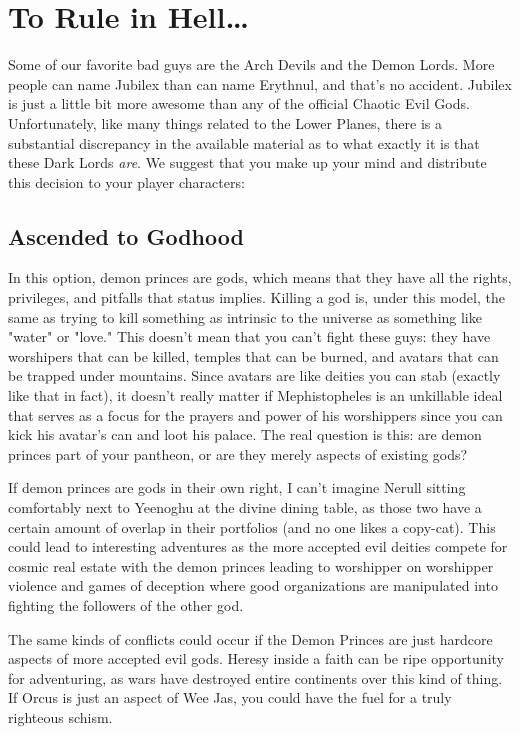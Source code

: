 \section{To Rule in Hell\ldots}

Some of our favorite bad guys are the Arch Devils and the Demon Lords. More people can name Jubilex than can name Erythnul, and that's no accident. Jubilex is just a little bit more awesome than any of the official Chaotic Evil Gods. Unfortunately, like many things related to the Lower Planes, there is a substantial discrepancy in the available material as to what exactly it is that these Dark Lords \textit{are}. We suggest that you make up your mind and distribute this decision to your player characters:

\subsection{Ascended to Godhood}

In this option, demon princes are gods, which means that they have all the rights, privileges, and pitfalls that status implies. Killing a god is, under this model, the same as trying to kill something as intrinsic to the universe as something like "water" or "love." This doesn't mean that you can't fight these guys: they have worshipers that can be killed, temples that can be burned, and avatars that can be trapped under mountains. Since avatars are like deities you can stab (exactly like that in fact), it doesn't really matter if Mephistopheles is an unkillable ideal that serves as a focus for the prayers and power of his worshippers since you can kick his avatar's can and loot his palace. The real question is this: are demon princes part of your pantheon, or are they merely aspects of existing gods?

If demon princes are gods in their own right, I can't imagine Nerull sitting comfortably next to Yeenoghu at the divine dining table, as those two have a certain amount of overlap in their portfolios (and no one likes a copy-cat). This could lead to interesting adventures as the more accepted evil deities compete for cosmic real estate with the demon princes leading to worshipper on worshipper violence and games of deception where good organizations are manipulated into fighting the followers of the other god.

The same kinds of conflicts could occur if the Demon Princes are just hardcore aspects of more accepted evil gods. Heresy inside a faith can be ripe opportunity for adventuring, as wars have destroyed entire continents over this kind of thing. If Orcus is just an aspect of Wee Jas, you could have the fuel for a truly righteous schism.

